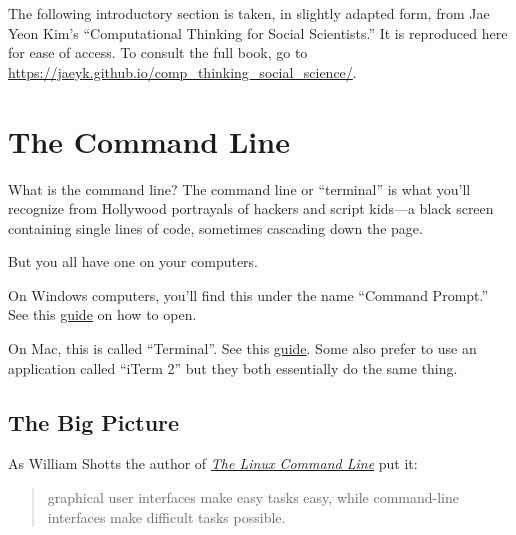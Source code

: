 \documentclass[
  letterpaper,
  DIV=11,
  numbers=noendperiod]{scrreprt}
\begin{document}
\begin{tcolorbox}[enhanced jigsaw, colframe=quarto-callout-note-color-frame, breakable, bottomrule=.15mm, left=2mm, colback=white, leftrule=.75mm, arc=.35mm, rightrule=.15mm, opacityback=0, toprule=.15mm]
\begin{minipage}[t]{5.5mm}
\textcolor{quarto-callout-note-color}{\faInfo}
\end{minipage}%
\begin{minipage}[t]{\textwidth - 5.5mm}
The following introductory section is taken, in slightly adapted form,
from Jae Yeon Kim's ``Computational Thinking for Social Scientists.'' It
is reproduced here for ease of access. To consult the full book, go to
\url{https://jaeyk.github.io/comp_thinking_social_science/}.\end{minipage}%
\end{tcolorbox}

\hypertarget{the-command-line}{%
\section*{The Command Line}\label{the-command-line}}

What is the command line? The command line or ``terminal'' is what
you'll recognize from Hollywood portrayals of hackers and script
kids---a black screen containing single lines of code, sometimes
cascading down the page.

But you all have one on your computers.

On Windows computers, you'll find this under the name ``Command
Prompt.'' See this
\href{https://www.wikihow.com/Open-Terminal-in-Windows}{guide} on how to
open.

On Mac, this is called ``Terminal''. See this
\href{https://www.wikihow.com/Open-a-Terminal-Window-in-Mac}{guide}.
Some also prefer to use an application called ``iTerm 2'' but they both
essentially do the same thing.

\hypertarget{the-big-picture}{%
\subsection*{The Big Picture}\label{the-big-picture}}

As William Shotts the author of
\href{http://linuxcommand.org/tlcl.php}{\emph{The Linux Command Line}}
put it:

\begin{quote}
graphical user interfaces make easy tasks easy, while command-line
interfaces make difficult tasks possible.
\end{quote}
\end{document}
